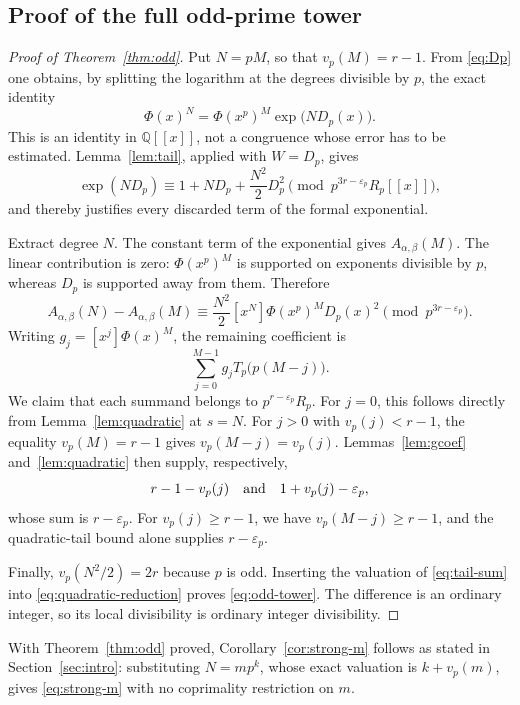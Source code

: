 \documentclass[11pt,a4paper]{article}
\numberwithin{equation}{section}
\theoremstyle{definition}
\theoremstyle{remark}
\newcommand{\Q}{\mathbb Q}
\newcommand{\eps}{\varepsilon}
\newcommand{\A}{A_{\alpha,\beta}}
\begin{document}
\subsection{Proof of the full odd-prime tower}
\begin{proof}[Proof of Theorem~\ref{thm:odd}]
Put $N=pM$, so that $v_p(M)=r-1$. From \eqref{eq:Dp} one obtains, by
splitting the logarithm at the degrees divisible by $p$, the exact identity
\begin{equation}\label{eq:factor}
 \Phi(x)^N=\Phi(x^p)^M\exp\bigl(ND_p(x)\bigr).
\end{equation}
This is an identity in $\Q[[x]]$, not a congruence whose error has to be
estimated. Lemma~\ref{lem:tail}, applied with $W=D_p$, gives
\begin{equation}\label{eq:exp-trunc}
 \exp(ND_p)\equiv1+ND_p+\frac{N^2}{2}D_p^2
 \pmod{p^{3r-\eps_p}R_p[[x]]},
\end{equation}
and thereby justifies every discarded term of the formal exponential.

Extract degree $N$. The constant term of the exponential gives $\A(M)$.
The linear contribution is zero: $\Phi(x^p)^M$ is supported on exponents
divisible by $p$, whereas $D_p$ is supported away from them. Therefore
\begin{equation}\label{eq:quadratic-reduction}
 \A(N)-\A(M)\equiv
 \frac{N^2}{2}[x^N]\Phi(x^p)^M D_p(x)^2
 \pmod{p^{3r-\eps_p}}.
\end{equation}
Writing $g_j=[x^j]\Phi(x)^M$, the remaining coefficient is
\begin{equation}\label{eq:tail-sum}
 \sum_{j=0}^{M-1}g_j T_p\bigl(p(M-j)\bigr).
\end{equation}
We claim that each summand belongs to $p^{r-\eps_p}R_p$.
For $j=0$, this follows directly from Lemma~\ref{lem:quadratic} at $s=N$.
For $j>0$ with $v_p(j)<r-1$, the equality $v_p(M)=r-1$ gives
$v_p(M-j)=v_p(j)$. Lemmas~\ref{lem:gcoef} and~\ref{lem:quadratic} then
supply, respectively,
\[
 r-1-v_p(j)\quad\hbox{and}\quad 1+v_p(j)-\eps_p,
\]
whose sum is $r-\eps_p$.
For $v_p(j)\ge r-1$, we have $v_p(M-j)\ge r-1$, and the quadratic-tail
bound alone supplies $r-\eps_p$.

Finally, $v_p(N^2/2)=2r$ because $p$ is odd. Inserting the valuation of
\eqref{eq:tail-sum} into \eqref{eq:quadratic-reduction} proves
\eqref{eq:odd-tower}. The difference is an ordinary integer, so its local
divisibility is ordinary integer divisibility.
\end{proof}

With Theorem~\ref{thm:odd} proved, Corollary~\ref{cor:strong-m} follows as
stated in Section~\ref{sec:intro}: substituting $N=mp^k$, whose exact
valuation is $k+v_p(m)$, gives \eqref{eq:strong-m} with no coprimality
restriction on $m$.
\end{document}
